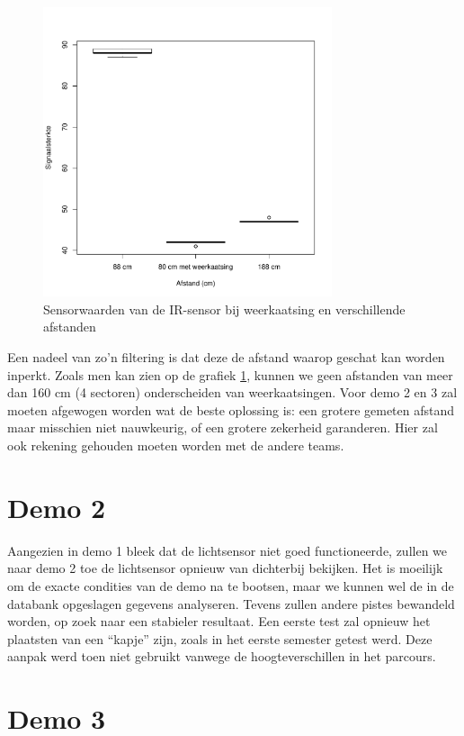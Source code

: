\documentclass[12pt,a4paper]{report}
\begin{document}
\begin{figure}
\begin{center}
 \includegraphics[width=85mm]{./resources/boxplotSpiegeling.pdf}
 \caption{Sensorwaarden van de IR-sensor bij weerkaatsing en verschillende afstanden}
 \label{fig:boxplotSpiegeling}
\end{center}
\end{figure}

Een nadeel van zo'n filtering is dat deze de afstand waarop geschat kan worden inperkt. Zoals men kan zien op de grafiek \ref{fig:boxplotSpiegeling}, kunnen we geen afstanden van meer dan 160 cm (4 sectoren) onderscheiden van weerkaatsingen. Voor demo 2 en 3 zal moeten afgewogen worden wat de beste oplossing is: een grotere gemeten afstand maar misschien niet nauwkeurig, of een grotere zekerheid garanderen. Hier zal ook rekening gehouden moeten worden met de andere teams. 

\section{Demo 2}

Aangezien in demo 1 bleek dat de lichtsensor niet goed functioneerde, zullen we naar demo 2 toe de lichtsensor opnieuw van dichterbij bekijken. Het is moeilijk om de exacte condities van de demo na te bootsen, maar we kunnen wel de in de databank opgeslagen gegevens analyseren. Tevens zullen andere pistes bewandeld worden, op zoek naar een stabieler resultaat. Een eerste test zal opnieuw het plaatsten van een ``kapje'' zijn, zoals in het eerste semester getest werd. Deze aanpak werd toen niet gebruikt vanwege de hoogteverschillen in het parcours. 

\section{Demo 3}
\end{document}
